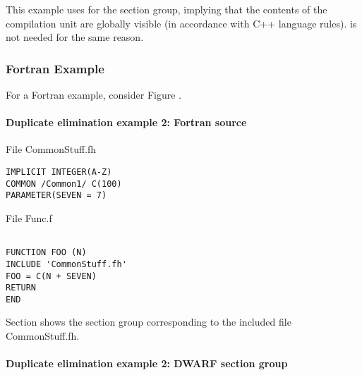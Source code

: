 This example uses  for the section group,
implying that the contents of the compilation unit are
globally visible (in accordance with C++ language rules).
 is not needed for the same reason.

\subsubsection{Fortran Example}


For a Fortran example, consider 
Figure .


\paragraph{Duplicate elimination example 2: Fortran source} 
\label{app:duplicateeliminationexample2fortransource}

File CommonStuff.fh

\begin{lstlisting}
IMPLICIT INTEGER(A-Z)
COMMON /Common1/ C(100)
PARAMETER(SEVEN = 7)
\end{lstlisting}

File Func.f
\begin{lstlisting}

FUNCTION FOO (N)
INCLUDE 'CommonStuff.fh'
FOO = C(N + SEVEN)
RETURN
END
\end{lstlisting}


Section 
shows the section group 
corresponding to the included file CommonStuff.fh.

\paragraph{Duplicate elimination example 2: DWARF section group}
\label{app:duplicateeliminationexample2dwarfsectiongroup}

